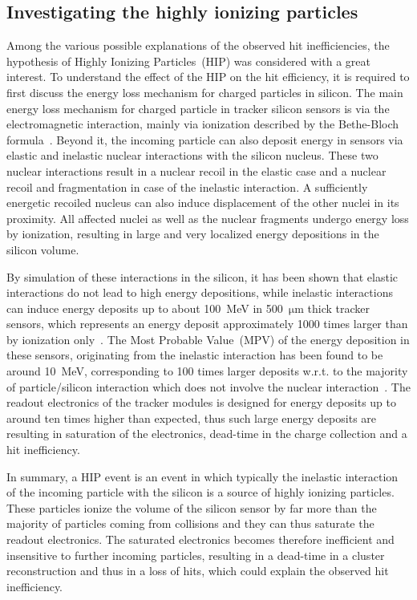 

\subsection{Investigating the highly ionizing particles}

Among the various possible explanations of the observed hit inefficiencies, the hypothesis of Highly Ionizing Particles~(HIP) was considered with a great interest. To understand the effect of the HIP on the hit efficiency, it is required to first discuss the energy loss mechanism for charged particles in silicon. The main energy loss mechanism for charged particle in tracker silicon sensors is via the electromagnetic interaction, mainly via ionization described by the Bethe-Bloch formula~\cite{Groom:2000sm}. Beyond it, the incoming particle can also deposit energy in sensors via elastic and inelastic nuclear interactions with the silicon nucleus. These two nuclear interactions result in a nuclear recoil in the elastic case and a nuclear recoil and fragmentation in case of the inelastic interaction. A sufficiently energetic recoiled nucleus can also induce displacement of the other nuclei in its proximity. All affected nuclei as well as the nuclear fragments undergo energy loss by ionization, resulting in large and very localized energy depositions in the silicon volume. 

By simulation of these interactions in the silicon, it has been shown that elastic interactions do not lead to high energy depositions, while inelastic interactions can induce energy deposits up to about 100~MeV in 500~$\mathrm{\mu m}$ thick tracker sensors, which represents an energy deposit approximately 1000 times larger than by ionization only~\cite{Huhtinen:2002yda}. The Most Probable Value~(MPV) of the energy deposition in these sensors, originating from the inelastic interaction has been found to be around 10~MeV, corresponding to 100 times larger deposits w.r.t. to the majority of particle/silicon interaction which does not involve the nuclear interaction~\cite{Adam:2005pz}. The readout electronics of the tracker modules is designed for energy deposits up to around ten times higher than expected, thus such large energy deposits are resulting in saturation of the electronics, dead-time in the charge collection and a hit inefficiency. 

In summary, a HIP event is an event in which typically the inelastic interaction of the incoming particle with the silicon is a source of highly ionizing particles. These particles ionize the volume of the silicon sensor by far more than the majority of particles coming from collisions and they can thus saturate the readout electronics. The saturated electronics becomes therefore inefficient and insensitive to further incoming particles, resulting in a dead-time in a cluster reconstruction and thus in a loss of hits, which could explain the observed hit inefficiency.

